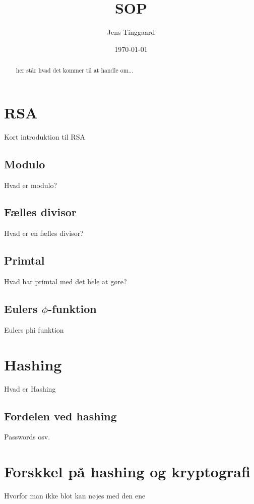 \documentclass[a4paper, 12pt]{article}
\date{\today}
\title{SOP}
\author{Jens Tinggaard}
\begin{document}
\clearpage\maketitle
\thispagestyle{empty}
\maketitle

\begin{abstract}
her står hvad det kommer til at handle om...
\end{abstract}


\newpage
\tableofcontents


\newpage
\section{RSA}
Kort introduktion til RSA\autocite{vestergaard}

    \subsection{Modulo}
    Hvad er modulo?

    \subsection{Fælles divisor}
    Hvad er en fælles divisor?

    \subsection{Primtal}
    Hvad har primtal med det hele at gøre?

    \subsection{Eulers \texorpdfstring{$\phi$}{Lg}-funktion}
    Eulers phi funktion



\section{Hashing}
Hvad er Hashing

    \subsection{Fordelen ved hashing}
    Passwords osv.



\section{Forskkel på hashing og kryptografi}
Hvorfor man ikke blot kan nøjes med den ene
\end{document}
